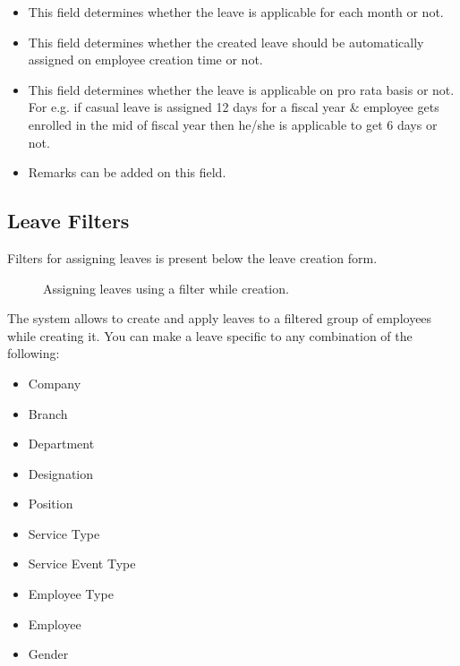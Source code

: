 \documentclass[letterpaper,10pt,english]{sphinxmanual}
\begin{document}
\begin{itemize}
\item {} 
 This field determines whether the leave is applicable for each month or not.

\item {} 
 This field determines whether the created leave should be automatically assigned on employee creation time or not.

\item {} 
 This field determines whether the leave is applicable on pro rata basis or not. For e.g. if casual leave is assigned 12 days for a fiscal year \& employee gets enrolled in the mid of fiscal year then he/she is applicable to get 6 days or not.

\item {} 
 Remarks can be added on this field.

\end{itemize}


\subsection{Leave Filters}
\label{\detokenize{leave-holiday/leave-configuration:leave-filters}}
Filters for assigning leaves is present below the leave creation form.

\begin{figure}[htbp]
\centering
\capstart

\noindent{}
\caption{Assigning leaves using a filter while creation.}\label{\detokenize{leave-holiday/leave-configuration:id3}}\end{figure}

The system allows to create and apply leaves to a filtered group of employees while creating it. You can make a leave specific to any combination of the following:
\begin{itemize}
\item {} 
Company

\item {} 
Branch

\item {} 
Department

\item {} 
Designation

\item {} 
Position

\item {} 
Service Type

\item {} 
Service Event Type

\item {} 
Employee Type

\item {} 
Employee

\item {} 
Gender

\end{itemize}
\end{document}
